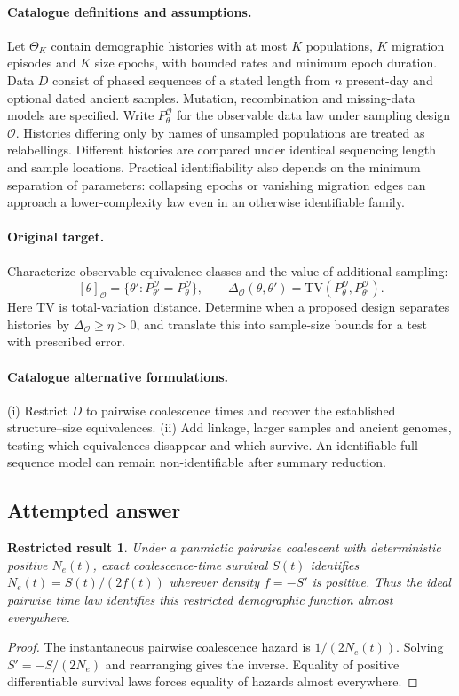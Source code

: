 \documentclass[11pt]{article}
\newtheorem{attemptresult}{Restricted result}[section]
\begin{document}
\paragraph{Catalogue definitions and assumptions.}
Let $\Theta_K$ contain demographic histories with at most $K$ populations, $K$ migration episodes and $K$ size epochs, with bounded rates and minimum epoch duration. Data $D$ consist of phased sequences of a stated length from $n$ present-day and optional dated ancient samples. Mutation, recombination and missing-data models are specified. Write $P_\theta^\mathcal O$ for the observable data law under sampling design $\mathcal O$. Histories differing only by names of unsampled populations are treated as relabellings. Different histories are compared under identical sequencing length and sample locations. Practical identifiability also depends on the minimum separation of parameters: collapsing epochs or vanishing migration edges can approach a lower-complexity law even in an otherwise identifiable family.
\paragraph{Original target.}
Characterize observable equivalence classes and the value of additional sampling:
\[
 [\theta]_{\mathcal O}=\{\theta':P_{\theta'}^\mathcal O=P_\theta^\mathcal O\},
 \qquad
 \Delta_{\mathcal O}(\theta,\theta')=
 \mathrm{TV}(P_\theta^\mathcal O,P_{\theta'}^\mathcal O).
\]
Here $\mathrm{TV}$ is total-variation distance. Determine when a proposed design separates histories by $\Delta_{\mathcal O}\ge\eta>0$, and translate this into sample-size bounds for a test with prescribed error.
\paragraph{Catalogue alternative formulations.}
(i) Restrict $D$ to pairwise coalescence times and recover the established structure--size equivalences. (ii) Add linkage, larger samples and ancient genomes, testing which equivalences disappear and which survive. An identifiable full-sequence model can remain non-identifiable after summary reduction.
\subsection{Attempted answer}
\begin{attemptresult}
Under a panmictic pairwise coalescent with deterministic positive $N_e(t)$, exact coalescence-time survival $S(t)$ identifies $N_e(t)=S(t)/(2f(t))$ wherever density $f=-S\prime$ is positive. Thus the ideal pairwise time law identifies this restricted demographic function almost everywhere.
\end{attemptresult}
\begin{proof}
The instantaneous pairwise coalescence hazard is $1/(2N_e(t))$. Solving $S\prime=-S/(2N_e)$ and rearranging gives the inverse. Equality of positive differentiable survival laws forces equality of hazards almost everywhere.
\end{proof}
\end{document}
